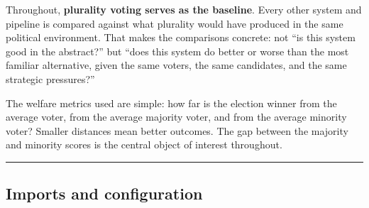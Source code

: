 \documentclass[11pt]{article}
\begin{document}
Throughout, \textbf{plurality voting serves as the baseline}. Every
other system and pipeline is compared against what plurality would have
produced in the same political environment. That makes the comparisons
concrete: not ``is this system good in the abstract?'' but ``does this
system do better or worse than the most familiar alternative, given the
same voters, the same candidates, and the same strategic pressures?''

The welfare metrics used are simple: how far is the election winner from
the average voter, from the average majority voter, and from the average
minority voter? Smaller distances mean better outcomes. The gap between
the majority and minority scores is the central object of interest
throughout.

    \begin{center}\rule{0.5\linewidth}{0.5pt}\end{center}

\subsection{Imports and configuration}\label{imports-and-configuration}
\end{document}
